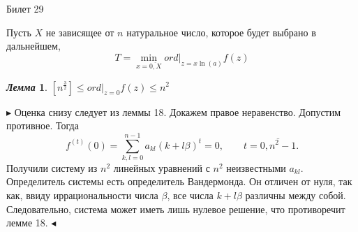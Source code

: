 \documentclass[a4paper,12pt]{article}
\newtheorem{lem}{\textit{Лемма}}
\newcommand{\q}{\quad}
\newcommand{\pb}{\blacktriangleright}
\newcommand{\pe}{\blacktriangleleft}
\newcommand{\SL}{\sum\limits}
\begin{document}
\newpage
\begin{mybox}{{Билет 29}}

Пусть $X$ не зависящее от $n$ натуральное число, которое будет выбрано в дальнейшем,
\begin{equation}
T = \min\limits_{x=\overline{0,X}} ord|_{z=x \ln (a)} f(z)\label{eq::10}
\end{equation}

\begin{formbox}{}
\begin{lem} $[n^\frac{3}{2}] \le ord|_{z=0}f(z) \le n^2$
\end{lem}
\end{formbox}
$\pb$ Оценка снизу следует из леммы 18. Докажем правое неравенство.
Допустим противное. Тогда \[f^{(t)}(0) = \SL_{k,l=0}^{n-1}a_{kl}(k + l\beta)^t = 0, \q\q t = \overline{0, n^2 - 1}.\]
Получили систему из $n^2$ линейных уравнений с $n^2$ неизвестными \(a_{kl}\). Определитель системы есть определитель Вандермонда. Он отличен от нуля, так как, ввиду иррациональности числа $\beta$, все числа $k+l\beta$ различны между собой. Следовательно, система может иметь лишь нулевое решение, что противоречит лемме 18. $\pe$

\end{mybox}
\newpage
\end{document}
